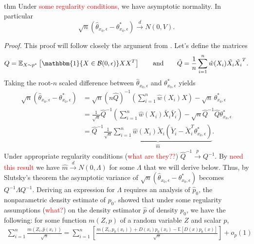 \documentclass[11pt]{article}
\begin{document}
\begin{restatable}{thm}{}
    Under \textcolor{red}{some regularity conditions,} we have asymptotic normality. In particular
    \[\sqrt{n}(\hat{\theta}_{x_0, \epsilon} - \theta^*_{x_0, \epsilon}) \overset{d}{\rightarrow} N(0, V).\]  
\end{restatable}
\noindent \textit{Proof.} This proof will follow closely the argument from \citet{Newey_Ruud_2005}. Let's define the matrices
\begin{equation}
    Q = \mathbb{E}_{X \sim p^*}\left[\mathbbm{1}\{X \in \mathcal{B}(0, \epsilon)\}XX^T\right] \qquad \text{and} \qquad \hat{Q} = \frac{1}{n}\sum_{i = 1}^n\hat{w}(X_i)\tilde{X_i}\tilde{X_i}^T.
\end{equation}
Taking the root-$n$ scaled difference between $\hat{\theta}_{x_0, \epsilon}$ and $\theta^*_{x_0, \epsilon}$ yields
\begin{align*}
    \sqrt{n}(\hat{\theta}_{x_0, \epsilon} -\theta^*_{x_0, \epsilon}) &= \sqrt{n}\left(n\hat{Q}\right)^{-1}\left(\sum_{i = 1}^n\hat{w}(X_i)X\right) - \sqrt{n}\,\theta_{x_0, \epsilon}^*\\
    &= \frac{1}{\sqrt{n}}\hat{Q}^{-1}\left(\sum_{i = 1}^n\hat{w}(X_i)\tilde{X_i}\tilde{Y_i}\right) - \sqrt{n}\hat{Q}^{-1}\hat{Q}\theta_{x_0, \epsilon}^* \\
    &= \hat{Q}^{-1}\underbrace{\frac{1}{\sqrt{n}}\sum_{i=1}^n \hat{w}(X_i)\tilde{X}_i\left(\tilde{Y}_i - \tilde{X}_i^T\theta^*_{x_0, \epsilon}\right)}_{\hat{m}}.
\end{align*}
Under appropriate regularity conditions (\textcolor{red}{what are they??}) $\hat{Q}^{-1} \overset{p}{\rightarrow} Q^{-1}$. By \textcolor{red}{need this result} we have $\hat{m} \overset{d}{\rightarrow} N(0, \Lambda)$ for some $\Lambda$ that we will derive below.  Thus, by Slutsky's theorem the asymptotic variance of $\sqrt{n}(\hat{\theta}_{x_0, \epsilon} -\theta^*_{x_0, \epsilon})$ becomes $Q^{-1}\Lambda Q^{-1}$. Deriving an expression for $\Lambda$ requires an analysis of $\hat{p}_0$, the nonparametric density estimate of $p_0$. \citet{newey1994kernel} showed that under some regularity assumptions (\textcolor{red}{what?}) on the density estimator $\hat{p}$ of density $p_0$, we have the following: for some function $m(Z, p)$ of a random variable $Z$ and scalar $p$,
\begin{align}
    \sum_{i = 1}^n\frac{m(Z_i, \hat{p}(x_i))}{\sqrt{n}} = \sum_{i = 1}^n \left[ \frac{m(Z_i, p_0(x_i)) + D(x_i)p_0(x_i) - \mathbb{E}[D(x)p_0(x)]}{\sqrt{n}}\right] + o_p(1)
\end{align}
\end{document}
